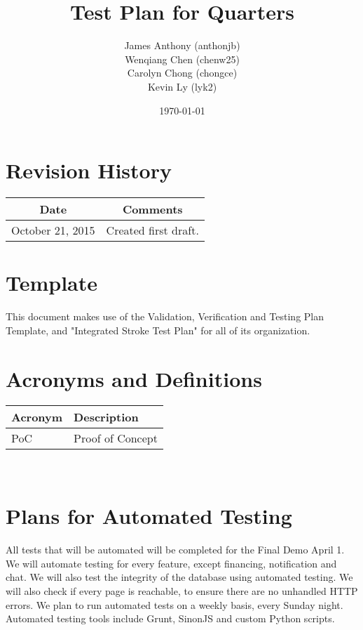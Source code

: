 \documentclass[12pt]{article}
\begin{document}
\title{Test Plan for Quarters} 
\author{James Anthony (anthonjb)\\ Wenqiang Chen (chenw25)\\ Carolyn Chong 
(chongce)\\ Kevin Ly (lyk2)}
\date{\today}
  
\maketitle

\pagebreak

\tableofcontents

\section*{Revision History}
\begin{tabular}{|c|c|}
\hline
\textbf{Date}  & \textbf{Comments} \\ \hline
October 21, 2015 & Created first draft. \\ 
\hline
\end{tabular}

\section*{Template}
This document makes use of the Validation, Verification and Testing Plan Template, and "Integrated Stroke Test Plan" for all of its organization.

\pagebreak


\section{Acronyms and Definitions}
\renewcommand{\arraystretch}{1.2}
\begin{tabular}{l l} 
  \toprule    
  \textbf{Acronym} & \textbf{Description}\\
  \midrule 
  PoC   &Proof of Concept\\
  \bottomrule
\end{tabular}\\


\section{Plans for Automated Testing}
All tests that will be automated will be completed for the Final Demo April 1. We will automate testing for every feature, except financing, notification and chat. We will also test the integrity of the database using automated testing. We will also check if every page is reachable, to ensure there are no unhandled HTTP errors. We plan to run automated tests on a weekly basis, every Sunday night. Automated testing tools include Grunt, SinonJS and custom Python scripts. 
\end{document}
